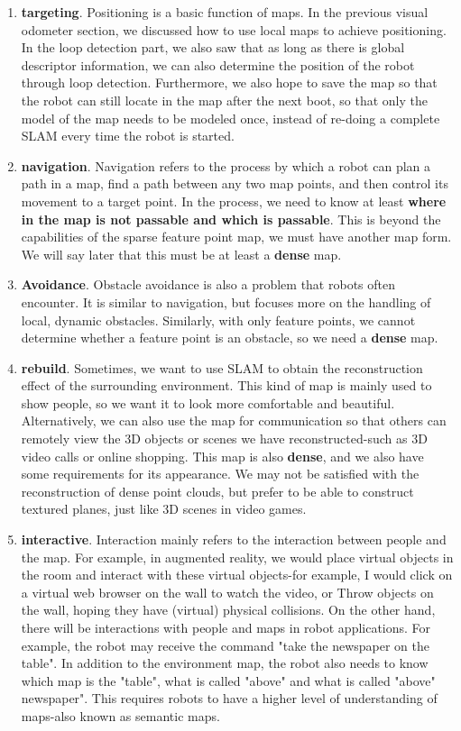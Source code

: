 \begin{enumerate}
\item \textbf{targeting}. Positioning is a basic function of maps. In the previous visual odometer section, we discussed how to use local maps to achieve positioning. In the loop detection part, we also saw that as long as there is global descriptor information, we can also determine the position of the robot through loop detection. Furthermore, we also hope to save the map so that the robot can still locate in the map after the next boot, so that only the model of the map needs to be modeled once, instead of re-doing a complete SLAM every time the robot is started.
\item \textbf{navigation}. Navigation refers to the process by which a robot can plan a path in a map, find a path between any two map points, and then control its movement to a target point. In the process, we need to know at least \textbf{where in the map is not passable and which is passable}. This is beyond the capabilities of the sparse feature point map, we must have another map form. We will say later that this must be at least a \textbf{dense} map.
\item \textbf{Avoidance}. Obstacle avoidance is also a problem that robots often encounter. It is similar to navigation, but focuses more on the handling of local, dynamic obstacles. Similarly, with only feature points, we cannot determine whether a feature point is an obstacle, so we need a \textbf{dense} map.
\item \textbf{rebuild}. Sometimes, we want to use SLAM to obtain the reconstruction effect of the surrounding environment. This kind of map is mainly used to show people, so we want it to look more comfortable and beautiful. Alternatively, we can also use the map for communication so that others can remotely view the 3D objects or scenes we have reconstructed-such as 3D video calls or online shopping. This map is also \textbf{dense}, and we also have some requirements for its appearance. We may not be satisfied with the reconstruction of dense point clouds, but prefer to be able to construct textured planes, just like 3D scenes in video games.
\item \textbf{interactive}. Interaction mainly refers to the interaction between people and the map. For example, in augmented reality, we would place virtual objects in the room and interact with these virtual objects-for example, I would click on a virtual web browser on the wall to watch the video, or Throw objects on the wall, hoping they have (virtual) physical collisions. On the other hand, there will be interactions with people and maps in robot applications. For example, the robot may receive the command "take the newspaper on the table". In addition to the environment map, the robot also needs to know which map is the "table", what is called "above" and what is called "above" newspaper". This requires robots to have a higher level of understanding of maps-also known as semantic maps.
\end{enumerate}


